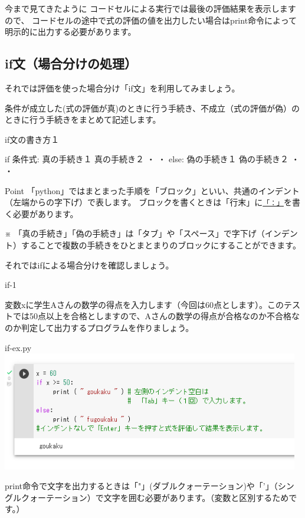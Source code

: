 \documentclass[11pt,a4paper,dvipdfmx,titlepage]{jsreport}
\begin{document}
今まで見てきたように {\gt コードセルによる実行}では最後の評価結果を表示しますので、
コードセルの途中で式の評価の値を出力したい場合はprint命令によって明示的に出力する必要があります。

\subsection{if文（場合分けの処理）}

それでは評価を使った場合分け「if文」を利用してみましょう。

条件が成立した(式の評価が真)のときに行う手続き、不成立（式の評価が偽）のときに行う手続きをまとめて記述します。


\begin{grabox}{if文の書き方１}
\begin{listing}{1}
if 条件式:
    真の手続き１
    真の手続き２
    ・
    ・
else:
    偽の手続き１
    偽の手続き２
    ・
    ・
\end{listing}
\end{grabox}
\begin{hipoint}{Point}
「python」ではまとまった手順を「ブロック」といい、共通のインデント（左端からの字下げ）で表します。
ブロックを書くときは「行末」に{\underline{\tt 「：」}}を書く必要があります。

※ 「真の手続き」「偽の手続き」は「タブ」や「スペース」で字下げ（インデント）することで複数の手続きをひとまとまりのブロックにすることができます。
\end{hipoint}

それではifによる場合分けを確認しましょう。

\begin{pabox}{if-1}

変数xに学生Aさんの数学の得点を入力します（今回は60点とします）。このテストでは50点以上を合格としますので、Aさんの数学の得点が合格なのか不合格なのか判定して出力するプログラムを作りましょう。

\begin{legbox}{if-ex.py}
\includegraphics[width=13cm]{images/colab16.png}
\end{legbox}


\begin{description}
 \item print命令で文字を出力するときは「"」(ダブルクォーテーション)や「'」（シングルクォーテーション）で文字を囲む必要があります。（変数と区別するためです。）
\end{description}
\end{pabox}
\end{document}
